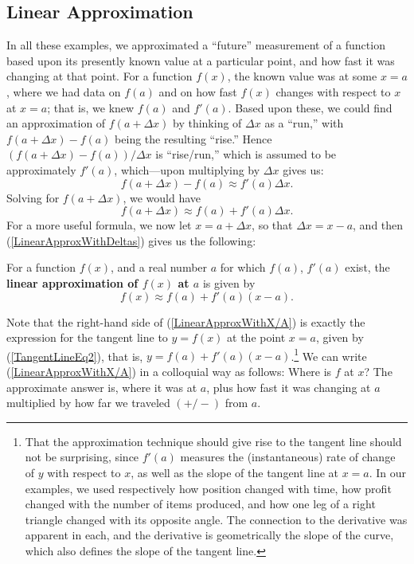 \subsection{Linear Approximation}
In all these examples, we approximated a ``future'' measurement
of a function based upon its presently known value at a particular
point, and how fast it was changing at that point.  For a function
$f(x)$, the known value was at some $x=a$, where we had data
on $f(a)$ and on how fast $f(x)$ changes with respect to
$x$ at $x=a$; that is, we knew $f(a)$ and $f'(a)$.  Based
upon these, we could find an approximation of $f(a+\Delta x)$
by thinking of $\Delta x$ as a ``run,'' with $f(a+\Delta x)-f(a)$
being the resulting  ``rise.''  Hence $(f(a+\Delta x)-f(a))/\Delta x$
is ``rise/run,'' which is assumed to be approximately $f'(a)$, which---upon
multiplying by $\Delta x$ gives us:
$$f(a+\Delta x)-f(a)\approx f'(a)\Delta x.$$
Solving for $f(a+\Delta x)$, we would have
\begin{equation}f(a+\Delta x)\approx f(a)+f'(a)\Delta x.
\label{LinearApproxWithDeltas}
\end{equation}
For a more useful formula, we now let $x=a+\Delta x$, so that $\Delta x=x-a$, 
and then 
(\ref{LinearApproxWithDeltas}) gives us the following:
\begin{definition}
For a function $f(x)$, and a real number $a$ for which $f(a)$, $f'(a)$
exist, the {\bf linear approximation of $f(x)$ at $a$} is 
given by
\begin{equation}
f(x)\approx f(a)+f'(a)(x-a).
\label{LinearApproxWithX/A}
\end{equation}
\end{definition}
Note that the right-hand side of (\ref{LinearApproxWithX/A})
is exactly the expression for the tangent line to $y=f(x)$
at the point $x=a$, given by 
(\ref{TangentLineEq2}), that is, 
$y=f(a)+f'(a)(x-a)$.\footnote{%
That the approximation technique should give rise to the  tangent
line should not be surprising, since $f'(a)$ measures the (instantaneous)
rate of change of $y$ with respect to $x$, as well as 
the slope of the tangent line at $x=a$.
In our examples, we
used respectively how position changed with time, how
profit changed with the number of items produced, and how 
one leg of a right triangle changed with its opposite angle.
The connection to the derivative was apparent in each, and the 
derivative is geometrically the slope of the curve, which also 
defines the slope of the tangent line.
}
We can write (\ref{LinearApproxWithX/A}) in a colloquial way as 
follows:  Where is $f$ at $x$?  The approximate answer is,
where it was at $a$, plus how fast it was changing at $a$ multiplied by
how far we traveled $(+/-)$ from  $a$. 
 
